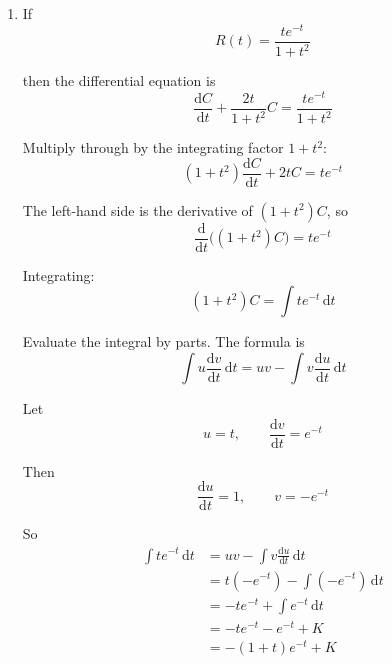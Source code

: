 \documentclass[leqno]{article}
\begin{document}
\begin{enumerate}[
  label=\textbf{\arabic*.},
  leftmargin=*,
  topsep=0pt,
  partopsep=0pt,
  parsep=0pt
]
\begin{djsSolution}
\begin{enumerate}[label=\textbf{(\alph*)}]
\begin{enumerate}[label=(\roman*)]
    Multiply through by the integrating factor \(1+t^2\):
    \[
    (1+t^2)\frac{\mathrm{d}C}{\mathrm{d}t}+2tC=0
    \]

    The left-hand side is the derivative of \((1+t^2)C\), so
    \[
    \frac{\mathrm{d}}{\mathrm{d}t}\bigl((1+t^2)C\bigr)=0
    \]

    Integrating gives
    \[
    (1+t^2)C=K
    \]

    where \(K\) is a constant.

    Use the initial condition \(C(0)=A\):
    \[
    (1+0^2)A=K
    \]

    so \(K=A\). Therefore
    \[
    C=\frac{A}{1+t^2}
    \]

    \item Half the initial concentration is \(\frac{A}{2}\), so set
    \[
    \frac{A}{1+t^2}=\frac{A}{2}
    \]

    Cancelling \(A\):
    \[
    \frac{1}{1+t^2}=\frac{1}{2}
    \]

    so
    \[
    1+t^2=2
    \]
    \[
    t^2=1
    \]

    Since \(t\ge 0\):
    \[
    t=1 \text{ hour}
    \]

    Therefore the time is \(60\) minutes.
  \end{enumerate}

  \item If
  \[
  R(t)=\frac{te^{-t}}{1+t^2}
  \]

  then the differential equation is
  \[
  \frac{\mathrm{d}C}{\mathrm{d}t}+\frac{2t}{1+t^2}C=\frac{te^{-t}}{1+t^2}
  \]

  Multiply through by the integrating factor \(1+t^2\):
  \[
  (1+t^2)\frac{\mathrm{d}C}{\mathrm{d}t}+2tC=te^{-t}
  \]

  The left-hand side is the derivative of \((1+t^2)C\), so
  \[
  \frac{\mathrm{d}}{\mathrm{d}t}\bigl((1+t^2)C\bigr)=te^{-t}
  \]

  Integrating:
  \[
  (1+t^2)C=\int te^{-t}\,\mathrm{d}t
  \]

  Evaluate the integral by parts. The formula is
  \[
  \int u\frac{\mathrm{d}v}{\mathrm{d}t}\,\mathrm{d}t=uv-\int v\frac{\mathrm{d}u}{\mathrm{d}t}\,\mathrm{d}t
  \]

  Let
  \[
  u=t,\qquad \frac{\mathrm{d}v}{\mathrm{d}t}=e^{-t}
  \]

  Then
  \[
  \frac{\mathrm{d}u}{\mathrm{d}t}=1,\qquad v=-e^{-t}
  \]

  So
  \begin{align*}
  \int te^{-t}\,\mathrm{d}t
  &=uv-\int v\frac{\mathrm{d}u}{\mathrm{d}t}\,\mathrm{d}t\\
  &=t(-e^{-t})-\int(-e^{-t})\,\mathrm{d}t\\
  &=-te^{-t}+\int e^{-t}\,\mathrm{d}t\\
  &=-te^{-t}-e^{-t}+K\\
  &=-(1+t)e^{-t}+K
  \end{align*}


\end{enumerate}
\end{djsSolution}
\end{enumerate}
\end{document}
